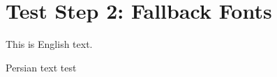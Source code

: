 \documentclass[12pt,a4paper]{article}
\begin{document}
\section*{Test Step 2: Fallback Fonts}

This is English text.

\textfarsi{Persian text test}
\end{document}
